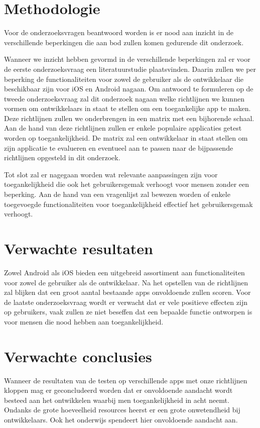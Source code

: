 \section{Methodologie}
\label{sec:methodologie}

Voor de onderzoeksvragen beantwoord worden is er nood aan inzicht in de verschillende beperkingen die aan bod zullen komen gedurende dit onderzoek. 

Wanneer we inzicht hebben gevormd in de verschillende beperkingen zal er voor de eerste onderzoeksvraag een literatuurstudie plaatsvinden. Daarin zullen we per beperking de functionaliteiten voor zowel de gebruiker als de ontwikkelaar die beschikbaar zijn voor iOS en Android nagaan. Om antwoord te formuleren op de tweede onderzoeksvraag zal dit onderzoek nagaan welke richtlijnen we kunnen vormen om ontwikkelaars in staat te stellen om een toegankelijke app te maken. Deze richtlijnen zullen we onderbrengen in een matrix met een bijhorende schaal. 
Aan de hand van deze richtlijnen zullen er enkele populaire applicaties getest worden op toegankelijkheid. De matrix zal een ontwikkelaar in staat stellen om zijn applicatie te evalueren en eventueel aan te passen naar de bijpassende richtlijnen opgesteld in dit onderzoek. 

Tot slot zal er nagegaan worden wat relevante aanpassingen zijn voor toegankelijkheid die ook het gebruikersgemak verhoogt voor mensen zonder een beperking. Aan de hand van een vragenlijst zal bewezen worden of enkele toegevoegde functionaliteiten voor toegankelijkheid effectief het gebruikersgemak verhoogt.


\section{Verwachte resultaten}
\label{sec:verwachte_resultaten}

 Zowel Android als iOS bieden een uitgebreid assortiment aan functionaliteiten voor zowel de gebruiker als de ontwikkelaar. Na het opstellen van de richtlijnen zal blijken dat een groot aantal bestaande apps onvoldoende zullen scoren. Voor de laatste onderzoeksvraag wordt er verwacht dat er vele positieve effecten zijn op gebruikers, vaak zullen ze niet beseffen dat een bepaalde functie ontworpen is voor mensen die nood hebben aan toegankelijkheid.

\section{Verwachte conclusies}
\label{sec:verwachte_conclusies}

Wanneer de resultaten van de testen op verschillende apps met onze richtlijnen kloppen mag er geconcludeerd worden dat er onvoldoende aandacht wordt besteed aan het ontwikkelen waarbij men toegankelijkheid in acht neemt. Ondanks de grote hoeveelheid resources heerst er een grote onwetendheid bij ontwikkelaars. Ook het onderwijs spendeert hier onvoldoende aandacht aan.
